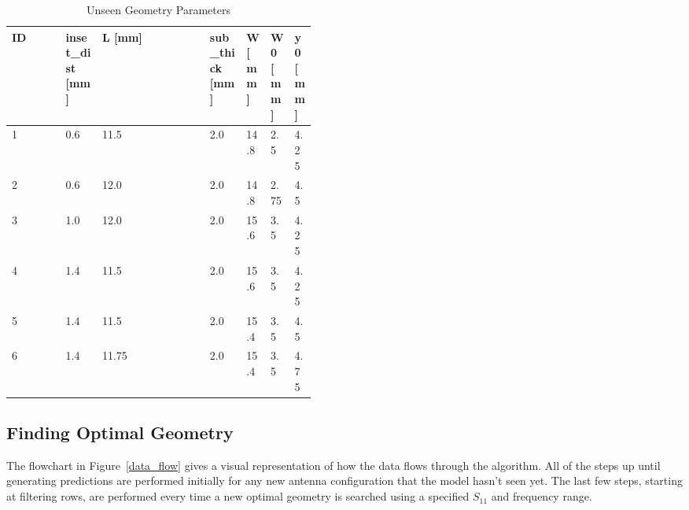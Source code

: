 \documentclass[lettersize,journal]{IEEEtran}
\begin{document}
\begin{table}[h]
\caption{Unseen Geometry Parameters}
\begin{center}
\begin{tabular}{ |l|p{0.12\linewidth}|l|p{0.12\linewidth}|p{0.07\linewidth}|p{0.07\linewidth}|p{0.07\linewidth}| }
    \hline
    ID & inset\_dist [mm] & L [mm] & sub\_thick [mm] & W [mm] & W0 [mm] & y0 [mm] \\ 
    \hline
    1 & 0.6 & 11.5 & 2.0 & 14.8 & 2.5 & 4.25 \\
    \hline
    2 & 0.6 & 12.0 & 2.0 & 14.8 & 2.75 & 4.5 \\
    \hline
    3 & 1.0 & 12.0 & 2.0 & 15.6 & 3.5 & 4.25 \\
    \hline
    4 & 1.4 & 11.5 & 2.0 & 15.6 & 3.5 & 4.25 \\
    \hline
    5 & 1.4 & 11.5 & 2.0 & 15.4 & 3.5 & 4.5 \\
    \hline
    6 & 1.4 & 11.75 & 2.0 & 15.4 & 3.5 & 4.75 \\
    \hline
\end{tabular}
\end{center}
\label{unseen_geometries}
\end{table}    

\subsection{Finding Optimal Geometry}
The flowchart in Figure~\ref{data_flow} gives a visual representation of how the data flows through the algorithm. All of the steps up until generating predictions are performed initially for any new antenna configuration that the model hasn't seen yet. The last few steps, starting at filtering rows, are performed every time a new optimal geometry is searched using a specified $S_{11}$ and frequency range. 
\end{document}
